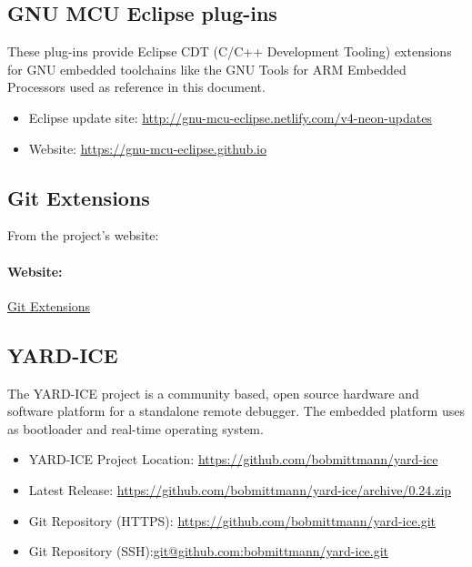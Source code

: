\subsection{GNU MCU Eclipse plug-ins}

These plug-ins provide Eclipse CDT (C/C++ Development Tooling) extensions for GNU embedded toolchains like the GNU Tools for ARM Embedded Processors used as reference in this document.

\begin{itemize}
\tightlist
\item
	{Eclipse update site:
	}{\href{http://gnu-mcu-eclipse.netlify.com/v4-neon-updates}{http://gnu-mcu-eclipse.netlify.com/v4-neon-updates}}
\item
	{Website:
	}{\href{https://gnu-mcu-eclipse.github.io}{https://gnu-mcu-eclipse.github.io}}
\end{itemize}

\subsection{Git Extensions}

From the project's website: \\


\paragraph{Website: }\href{http://git-extensions-documentation.readthedocs.io/en/latest/git_extensions.html}{Git Extensions}


\subsection{YARD-ICE}

The YARD-ICE project is a community based, open source hardware and software platform for a standalone remote debugger. The embedded platform uses \ThinkOS as bootloader and real-time operating system.

\begin{itemize}
\tightlist
\item
  {YARD-ICE Project Location:
  }{\href{https://github.com/bobmittmann/yard-ice}{https://github.com/bobmittmann/yard-ice}}
\item
  {Latest Release:
  }{\href{https://github.com/bobmittmann/yard-ice/archive/0.24.zip}{https://github.com/bobmittmann/yard-ice/archive/0.24.zip}}
\item
  {Git Repository (HTTPS):}
  {\href{https://github.com/bobmittmann/yard-ice.git}{https://github.com/bobmittmann/yard-ice.git}}
\item
  {Git Repository (SSH):}{\href{git@github.com:bobmittmann/yard-ice.git}{git@github.com:bobmittmann/yard-ice.git}}
\end{itemize}

